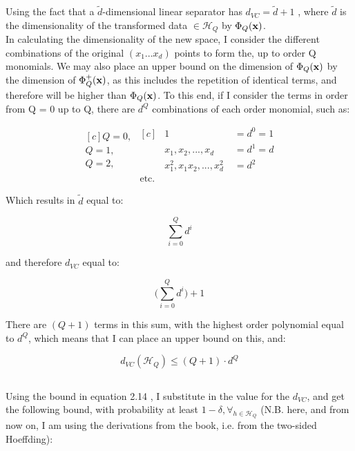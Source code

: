 \documentclass{scrartcl}
\begin{document}
Using the fact that a $\tilde{d}$-dimensional linear separator has $d_{VC} = \tilde{d} + 1$ \cite[p. 52]{abu}, where $\tilde{d}$ is the dimensionality of the transformed data $\in \mathcal{H}_Q$ by $\Phi_Q({\mathbf x})$.\\

In calculating the dimensionality of the new space, I consider the different combinations of the original $(x_1...x_d)$ points to form the, up to order Q monomials. We may also place an upper bound on the dimension of $\Phi_Q({\mathbf x})$ by the dimension of $\Phi_Q^+({\mathbf x})$, as this includes the repetition of identical terms, and therefore will be higher than $\Phi_Q({\mathbf x})$. To this end, if I consider the terms in order from Q = 0 up to Q, there are $d^Q$ combinations of each order monomial, such as:

\begin{equation*}
\begin{aligned}[c]
    Q=0, \\
    Q=1, \\
    Q=2, \\
    \\
\end{aligned}
\begin{aligned}[c]
    &1 \; &= d^0 = 1 \\
    &x_1, x_2, ..., x_d \; &= d^1 = d \\
    &x_1^2, x_1x_2, ..., x_d^2 \; &= d^2 \\
    \text{etc.}
\end{aligned}
\end{equation*}

Which results in $\tilde{d}$ equal to:

\[ \sum^Q_{i=0} d^i \]

and therefore $d_{VC}$ equal to:

\[ \big( \sum^Q_{i=0} d^i \big) + 1 \]

There are $(Q+1)$ terms in this sum, with the highest order polynomial equal to $d^Q$, which means that I can place an upper bound on this, and:

\[ d_{VC} (\mathcal{H}_Q) \leq (Q + 1) \cdot d^Q  \]

\subsection{}
Using the bound in equation 2.14 \cite[p. 58]{abu}, I substitute in the value for the $d_{VC}$, and get the following bound, with probability at least $1 - \delta, \forall_{h \in \mathcal{H}_Q}$ (N.B. here, and from now on, I am using the derivations from the book, i.e. from the two-sided Hoeffding):
\end{document}

